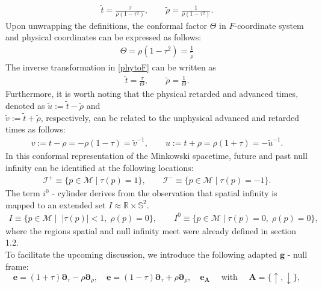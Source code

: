 \begin{align}\label{phytoF}
\tilde{t} = \frac{\tau}{\rho (1-\tau^2)}, \qquad \tilde{\rho}=\frac{1}{\rho (1-\tau^2)}.
\end{align}
Upon unwrapping the definitions, the conformal factor $\Theta$ in $F$-coordinate system and physical coordinates can be expressed as follows:
\begin{align}
\Theta = \rho (1-\tau^2) = \frac{1}{\tilde{\rho}}
\end{align}
The inverse transformation in \eqref{phytoF} can be written as
\begin{align}
\tilde{t}=\frac{\tau}{\Theta}, \qquad \tilde{\rho}= \frac{1}{\Theta}.
\end{align}
Furthermore, it is worth noting that the physical retarded and advanced times, denoted as $\tilde{u}:=\tilde{t}- \tilde{\rho}$ and 
\\$ \tilde{v}:= \tilde{t}+ \tilde{\rho}$, respectively, can be related to the unphysical advanced and retarded times as follows:
\begin{align}\label{eq:UnphysPhysAdvRet}
v:=t-\rho=-\rho(1-\tau)=\tilde{v}^{-1}, \qquad u:=t+\rho=\rho(1+\tau)=-\tilde{u}^{-1}.
\end{align}
In this conformal representation of the Minkowski spacetime, future and past null infinity can be identified at the following locations:
\begin{align}
\mathscr{I}^{+} \equiv \{ p \in \mathcal{M} \; \rvert\; \tau(p) =1\}, \qquad \mathscr{I}^{-} \equiv \{ p \in \mathcal{M} \; \rvert \;\tau(p) =-1\}.
\end{align}
The term $i^0$ - cylinder derives from the observation that spatial infinity is mapped to an extended set $I \approx \mathbb{R}\times \mathbb{S}^2$.
\begin{align*}
I \equiv \{ p \in \mathcal{M} \; \rvert \;\; |\tau(p)|<1, \;\rho(p)=0\}, \qquad I^{0} \equiv \{ p \in \mathcal{M}\; \rvert \;\tau(p)=0, \; \rho(p)=0\},
\end{align*}
where the regions spatial and null infinity meet were already defined in section 1.2.\\
To facilitate the upcoming discussion, we introduce the following adapted $\boldsymbol{g}$ - null frame:
\begin{equation}\label{eq:Fframe}
\boldsymbol{e}=(1+\tau) \boldsymbol{\partial}_\tau-\rho \boldsymbol{\partial}_\rho, \quad \underline{\boldsymbol{e}}=(1-\tau) \boldsymbol{\partial}_\tau+\rho \boldsymbol{\partial}_\rho, \quad \boldsymbol{e}_{\boldsymbol{A}} \quad \text { with } \quad \boldsymbol{A}=\{\uparrow, \downarrow\},
\end{equation}
